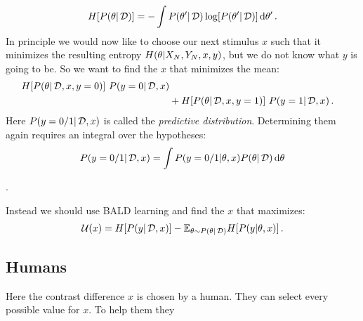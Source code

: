 \begin{align}
	H[{P(\theta | \,\mathcal{D})}] = - \int {P(\theta' | \,\mathcal{D})} \log[{P(\theta' | \,\mathcal{D})}] \,\mathrm{d} \theta' \,.
\end{align}
In principle we would now like to choose our next stimulus $x$ such that it minimizes the resulting entropy $H(\theta | X_N, Y_N, x, y)$, but we do not know what $y$ is going to be. So we want to find the $x$ that minimizes the mean:
\begin{align}
	H[{P(\theta | \,\mathcal{D}, x, y = 0)}] ~
	{P(y = 0 | \,\mathcal{D}, x)} \\
	&+
	H[{P(\theta | \,\mathcal{D}, x, y = 1)}] ~
	{P(y = 1 | \,\mathcal{D}, x)} \,.
\end{align}
Here ${P(y = 0/1 | \,\mathcal{D}, x)}$ is called the \emph{predictive distribution}. Determining them again requires an integral over the hypotheses:
\begin{align}
	{P(y = 0/1 | \,\mathcal{D}, x)}
	= \int {P(y = 0/1 | \theta, x)} {P(\theta| \,\mathcal{D})} \,\mathrm{d} \theta
\end{align}

.

Instead we should use BALD learning and find the $x$ that maximizes:
\begin{align}
	\mathcal{U}(x) = H[{P(y | \,\mathcal{D}, x)}]
	- \mathbb{E}_{\theta \sim {P(\theta| \,\mathcal{D})}} H[{P(y | \theta, x)}] \,.
\end{align}

\subsection{Humans} %
\label{sub:humans}
Here the contrast difference $x$ is chosen by a human. They can select every possible value for $x$. To help them they




